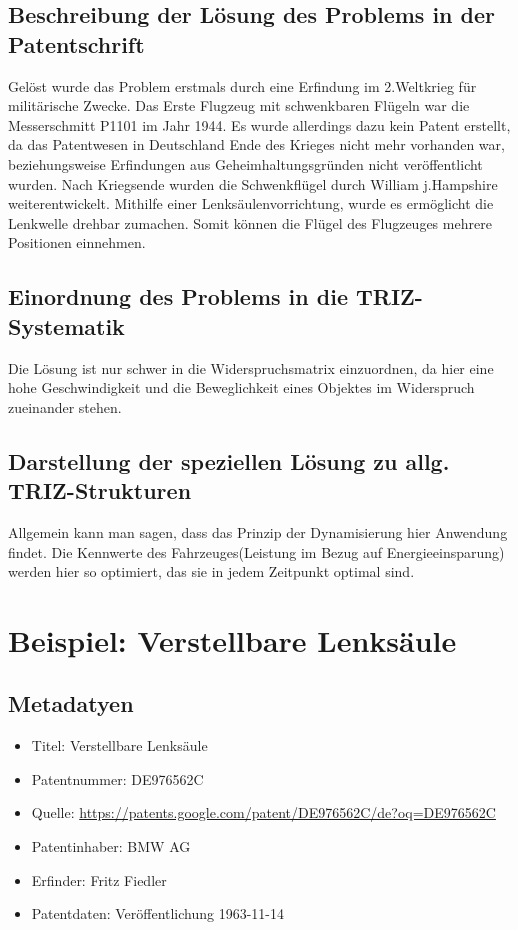 \documentclass[11pt,a4paper]{article}
\begin{document}
\subsection{Beschreibung der Lösung des Problems in der Patentschrift}
Gelöst wurde das Problem erstmals durch eine Erfindung im 2.Weltkrieg für
militärische Zwecke. Das Erste Flugzeug mit schwenkbaren Flügeln war die
Messerschmitt P1101 im Jahr 1944.  Es wurde allerdings dazu kein Patent
erstellt, da das Patentwesen in Deutschland Ende des Krieges nicht mehr
vorhanden war, beziehungsweise Erfindungen aus Geheimhaltungsgründen nicht
veröffentlicht wurden. Nach Kriegsende wurden die Schwenkflügel durch William
j.Hampshire weiterentwickelt. Mithilfe einer Lenksäulenvorrichtung, wurde es
ermöglicht die Lenkwelle drehbar zumachen. Somit können die Flügel des
Flugzeuges mehrere Positionen einnehmen.
\subsection{Einordnung des Problems in die TRIZ-Systematik}
Die Lösung ist nur schwer in die Widerspruchsmatrix einzuordnen, da hier eine
hohe Geschwindigkeit und die Beweglichkeit eines Objektes im Widerspruch
zueinander stehen.
\subsection{Darstellung der speziellen Lösung zu allg. TRIZ-Strukturen}
Allgemein kann man sagen, dass das Prinzip der Dynamisierung hier Anwendung
findet. Die Kennwerte des Fahrzeuges(Leistung im Bezug auf Energieeinsparung)
werden hier so optimiert, das sie in jedem Zeitpunkt optimal sind.

\section{Beispiel: Verstellbare Lenksäule}
\subsection{Metadatyen}
\begin{itemize}\itemsep0pt
\item Titel: Verstellbare Lenksäule
\item Patentnummer: DE976562C
\item Quelle: \url{https://patents.google.com/patent/DE976562C/de?oq=DE976562C}
\item Patentinhaber: BMW AG 
\item Erfinder: Fritz Fiedler 
\item Patentdaten: Veröffentlichung 1963-11-14
\end{itemize}
\end{document}
